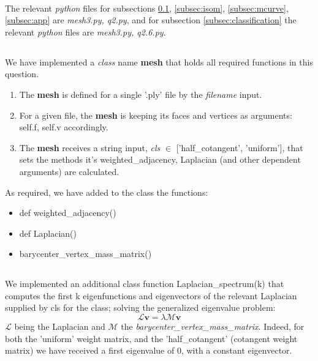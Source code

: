 \\

The relevant \emph{python} files for subsections \ref{subsec:perlim}, \ref{subsec:isom}, \ref{subsec:mcurve}, \ref{subsec:app} are \emph{mesh3.py, q2.py}, and for subsection \ref{subsec:classification} the relevant \emph{python} files are \emph{mesh3.py, q2.6.py}.\\

\subsection{}\label{subsec:perlim}
We have implemented a \emph{class} name \textbf{mesh} that holds all required functions in this question. 
\begin{enumerate}
    \item The \textbf{mesh} is defined for a single '.ply' file by the \emph{filename} input.
    \item For a given file, the \textbf{mesh} is keeping its faces and vertices as arguments: self.f, self.v accordingly.
    \item The \textbf{mesh} receives a string input, \emph{cls} $\in$ ['half\_cotangent', 'uniform'], that sets the methods it's weighted\_adjacency, Laplacian (and other dependent arguments) are calculated.
\end{enumerate}

As required, we have added to the class the functions:
\begin{itemize}
    \item def weighted\_adjacency()
    \item def Laplacian()
    \item barycenter\_vertex\_mass\_matrix()
\end{itemize}

\subsection{}\label{subsec:l_spec}
We implemented an additional class function Laplacian\_spectrum(k) that computes the first k eigenfunctions and eigenvectors of the relevant Laplacian supplied by cls for the class; solving the generalized eigenvalue problem:
\[
\mathcal{L}\mathbf{v}=\lambda\mathcal{M}\mathbf{v}
\]
$\mathcal{L}$ being the Laplacian and $\mathcal{M}$ the \emph{barycenter\_vertex\_mass\_matrix}. Indeed, for both the 'uniform' weight matrix, and the 'half\_cotangent' (cotangent weight matrix) we have received a first eigenvalue of 0, with a constant eigenvector.

